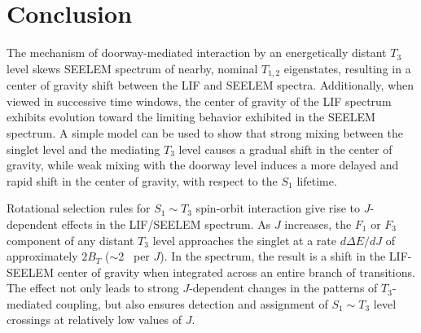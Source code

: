 \documentclass[12pt]{mitthesis}
\begin{document}






























\section{Conclusion}

The mechanism of doorway-mediated interaction by an energetically
distant $T_3$ level skews SEELEM spectrum of nearby, nominal $T_{1,2}$
eigenstates, resulting in a center of gravity shift between the LIF
and SEELEM spectra.  Additionally, when viewed in successive time
windows, the center of gravity of the LIF spectrum exhibits evolution
toward the limiting behavior exhibited in the SEELEM spectrum.  A
simple model can be used to show that strong mixing between the
singlet level and the mediating $T_3$ level causes a gradual shift in
the center of gravity, while weak mixing with the doorway level
induces a more delayed and rapid shift in the center of gravity, with
respect to the $S_1$ lifetime.

Rotational selection rules for $S_1 \sim T_3$ spin-orbit interaction
give rise to $J$-dependent effects in the LIF/SEELEM spectrum.  As $J$
increases, the $F_1$ or $F_3$ component of any distant $T_3$ level
approaches the singlet at a rate $d\Delta E / dJ$ of approximately
$2B_T$ ($\sim$2 \rcm\ per $J$).  In the spectrum, the result is a
shift in the LIF-SEELEM center of gravity when integrated across an
entire branch of transitions.  The effect not only leads to strong
$J$-dependent changes in the patterns of $T_3$-mediated coupling, but
also ensures detection and assignment of $S_1 \sim T_3$ level
crossings at relatively low values of $J$.
\end{document}
